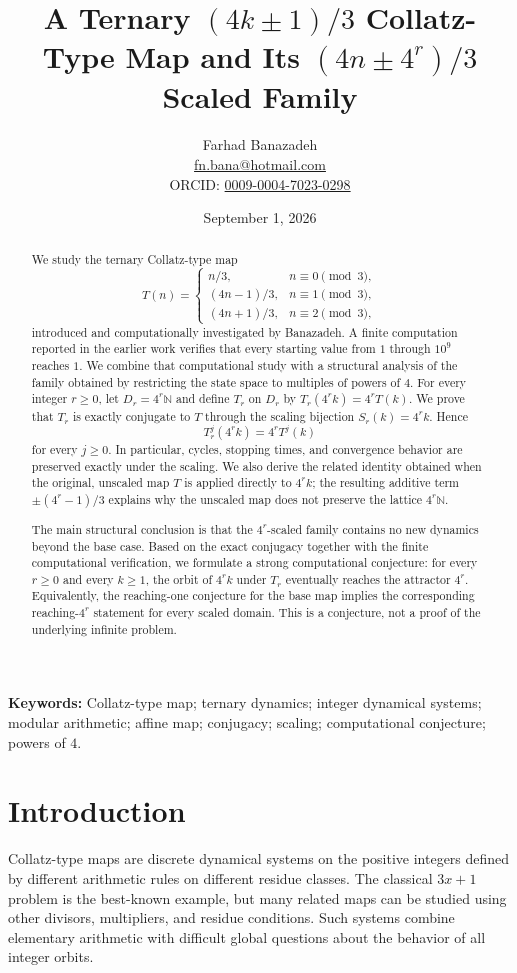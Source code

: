 \documentclass[11pt]{article}
\title{A Ternary $(4k\!\pm\!1)/3$ Collatz-Type Map and Its $(4n\!\pm\!4^r)/3$ Scaled Family}
\author{Farhad Banazadeh\\
\href{mailto:fn.bana@hotmail.com}{fn.bana@hotmail.com}\\
ORCID: \href{https://orcid.org/0009-0004-7023-0298}{0009-0004-7023-0298}}
\date{September 1, 2026}
\newcommand{\N}{\mathbb{N}}
\begin{document}
\maketitle

\begin{abstract}
We study the ternary Collatz-type map
\[
T(n)=\begin{cases}
 n/3,&n\equiv0\pmod 3,\\
 (4n-1)/3,&n\equiv1\pmod 3,\\
 (4n+1)/3,&n\equiv2\pmod 3,
\end{cases}
\]
introduced and computationally investigated by Banazadeh. A finite computation reported in the earlier work verifies that every starting value from $1$ through $10^9$ reaches $1$. We combine that computational study with a structural analysis of the family obtained by restricting the state space to multiples of powers of $4$. For every integer $r\ge0$, let $D_r=4^r\N$ and define $T_r$ on $D_r$ by $T_r(4^rk)=4^rT(k)$. We prove that $T_r$ is exactly conjugate to $T$ through the scaling bijection $S_r(k)=4^rk$. Hence
\[
T_r^j(4^rk)=4^rT^j(k)
\]
for every $j\ge0$. In particular, cycles, stopping times, and convergence behavior are preserved exactly under the scaling. We also derive the related identity obtained when the original, unscaled map $T$ is applied directly to $4^rk$; the resulting additive term $\pm(4^r-1)/3$ explains why the unscaled map does not preserve the lattice $4^r\N$.

The main structural conclusion is that the $4^r$-scaled family contains no new dynamics beyond the base case. Based on the exact conjugacy together with the finite computational verification, we formulate a strong computational conjecture: for every $r\ge0$ and every $k\ge1$, the orbit of $4^rk$ under $T_r$ eventually reaches the attractor $4^r$. Equivalently, the reaching-one conjecture for the base map implies the corresponding reaching-$4^r$ statement for every scaled domain. This is a conjecture, not a proof of the underlying infinite problem.
\end{abstract}

\noindent\textbf{Keywords:} Collatz-type map; ternary dynamics; integer dynamical systems; modular arithmetic; affine map; conjugacy; scaling; computational conjecture; powers of $4$.

\section{Introduction}
Collatz-type maps are discrete dynamical systems on the positive integers defined by different arithmetic rules on different residue classes. The classical $3x+1$ problem is the best-known example, but many related maps can be studied using other divisors, multipliers, and residue conditions. Such systems combine elementary arithmetic with difficult global questions about the behavior of all integer orbits.
\end{document}
